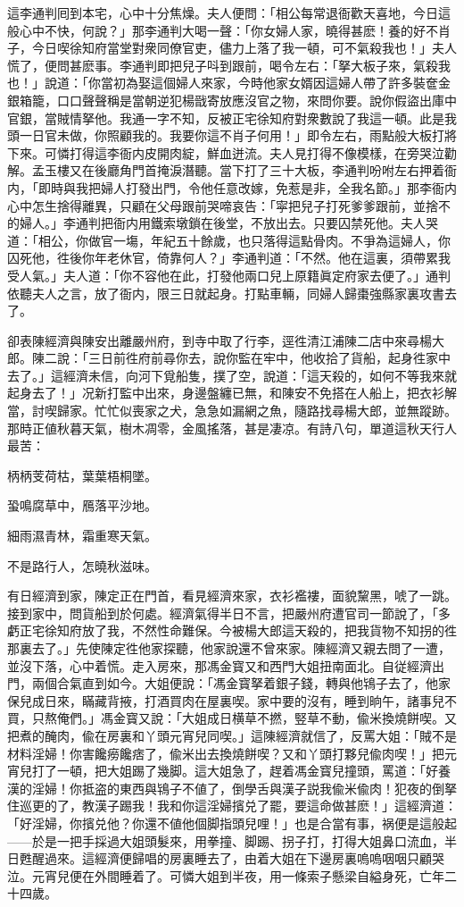 這李通判囘到本宅，心中十分焦燥。夫人便問：「相公每常退衙歡天喜地，今日這般心中不快，何說？」那李通判大喝一聲：「你女婦人家，曉得甚麽！養的好不肖子，今日喫徐知府當堂對衆同僚官吏，儘力上落了我一頓，可不氣殺我也！」夫人慌了，便問甚麽事。李通判即把兒子呌到跟前，喝令左右：「拏大板子來，氣殺我也！」說道：「你當初為娶這個婦人來家，今時他家女婿因這婦人帶了許多裝奩金銀箱籠，口口聲聲稱是當朝逆犯楊戩寄放應沒官之物，來問你要。說你假盜出庫中官銀，當賊情拏他。我通一字不知，反被正宅徐知府對衆數說了我這一頓。此是我頭一日官未做，你照顧我的。我要你這不肖子何用！」即令左右，雨點般大板打將下來。可憐打得這李衙内皮開肉綻，鮮血迸流。夫人見打得不像模樣，在旁哭泣勸解。孟玉樓又在後廳角門首掩淚潛聽。當下打了三十大板，李通判吩咐左右押着衙内，「即時與我把婦人打發出門，令他任意改嫁，免惹是非，全我名節。」那李衙内心中怎生捨得離異，只顧在父母跟前哭啼哀告：「寜把兒子打死爹爹跟前，並捨不的婦人。」李通判把衙内用鐵索墩鎖在後堂，不放出去。只要囚禁死他。夫人哭道：「相公，你做官一塲，年紀五十餘歲，也只落得這點骨肉。不爭為這婦人，你囚死他，徃後你年老休官，倚靠何人？」李通判道：「不然。他在這裏，須帶累我受人氣。」夫人道：「你不容他在此，打發他兩口兒上原籍眞定府家去便了。」通判依聽夫人之言，放了衙内，限三日就起身。打點車輛，同婦人歸棗強縣家裏攻書去了。

卻表陳經濟與陳安出離嚴州府，到寺中取了行李，逕徃清江浦陳二店中來尋楊大郎。陳二說：「三日前徃府前尋你去，說你監在牢中，他收拾了貨船，起身徃家中去了。」這經濟未信，向河下覓船隻，撲了空，說道：「這天殺的，如何不等我來就起身去了！」况新打監中出來，身邊盤纏已無，和陳安不免搭在人船上，把衣衫解當，討喫歸家。忙忙似喪家之犬，急急如漏網之魚，隨路找尋楊大郎，並無蹤跡。那時正値秋暮天氣，樹木凋零，金風搖落，甚是凄凉。有詩八句，單道這秋天行人最苦：

\begin{myquote}
柄柄芰荷枯，葉葉梧桐墜。

蛩鳴腐草中，鴈落平沙地。

細雨濕青林，霜重寒天氣。

不是路行人，怎曉秋滋味。
\end{myquote}

有日經濟到家，陳定正在門首，看見經濟來家，衣衫襤褸，面貌黧黑，唬了一跳。接到家中，問貨船到於何處。經濟氣得半日不言，把嚴州府遭官司一節說了，「多虧正宅徐知府放了我，不然性命難保。今被楊大郎這天殺的，把我貨物不知拐的徃那裏去了。」先使陳定徃他家探聽，他家說還不曾來家。陳經濟又親去問了一遭，並沒下落，心中着慌。走入房來，那馮金寳又和西門大姐扭南面北。自従經濟出門，兩個合氣直到如今。大姐便說：「馮金寳拏着銀子錢，轉與他鴇子去了，他家保兒成日來，瞞藏背掖，打酒買肉在屋裏喫。家中要的沒有，睡到晌午，諸事兒不買，只熬俺們。」馮金寳又說：「大姐成日横草不撚，竪草不動，偸米換燒餅喫。又把煮的醃肉，偸在房裏和丫頭元宵兒同喫。」這陳經濟就信了，反罵大姐：「賊不是材料淫婦！你害饞癆饞痞了，偸米出去換燒餅喫？又和丫頭打夥兒偸肉喫！」把元宵兒打了一頓，把大姐踢了幾脚。這大姐急了，趕着馮金寳兒撞頭，罵道：「好養漢的淫婦！你抵盗的東西與鴇子不値了，倒學舌與漢子説我偸米偸肉！犯夜的倒拏住巡更的了，教漢子踢我！我和你這淫婦擯兑了罷，要這命做甚麽！」這經濟道：「好淫婦，你擯兑他？你還不値他個脚指頭兒哩！」也是合當有事，祸便是這般起——於是一把手採過大姐頭髮來，用拳撞、脚踢、拐子打，打得大姐鼻口流血，半日甦醒過來。這經濟便歸唱的房裏睡去了，由着大姐在下邊房裏嗚嗚咽咽只顧哭泣。元宵兒便在外間睡着了。可憐大姐到半夜，用一條索子懸梁自縊身死，亡年二十四歲。

